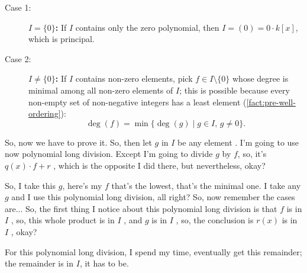 \begin{proofWrapper}
\begin{hidden}
\end{hidden}

\begin{content}
\begin{description}
    \item[Case 1:] \textbf{$I = \{0\}$:} If $I$ contains only the zero polynomial, then $I = (0) = 0 \cdot k[x]$, which is principal.
    \item[Case 2:] \textbf{$I \neq \{0\}$:} If $I$ contains non-zero elements, pick $f \in I \setminus \{0\}$ whose degree is minimal among all non-zero elements of $I$; this is possible because every non-empty set of non-negative integers has a least element (\cref{fact:pre-well-ordering}):
    \begin{equation}\label{eq:minimal-degree-f}
    \deg(f) = \min \{ \deg(g) \mid g \in I, \, g \neq 0 \}.
    \end{equation}
\end{description}
\end{content}

\begin{speech}[00:34:07 - 00:35:15]
So, now we have to prove it. So, then let $g$ in $I$ be any element . I'm going to use now polynomial long division. Except I'm going to divide $g$ by $f$, so, it's $q(x) \cdot f + r$ , which is the opposite I did there, but nevertheless, okay?

So, I take this $g$, here's my $f$ that's the lowest, that's the minimal one. I take any $g$ and I use this polynomial long division, all right? So, now remember the cases are... So, the first thing I notice about this polynomial long division is that $f$ is in $I$ , so, this whole product is in $I$ , and $g$ is in $I$ , so, the conclusion is $r(x)$ is in $I$ , okay?

For this polynomial long division, I spend my time, eventually get this remainder; the remainder is in $I$, it has to be.
\end{speech}


\end{proofWrapper}

